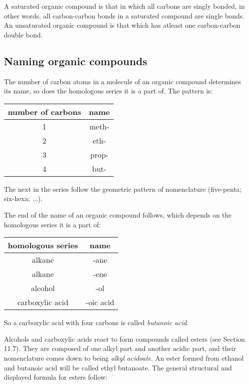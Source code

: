 A saturated organic compound is that in which all carbons are singly bonded, in other words, all
carbon-carbon bonds in a saturated compound are single bonds. An unsaturated organic compound is
that which has atleast one carbon-carbon double bond.

\subsection{Naming organic compounds}

The number of carbon atoms in a molecule of an organic compound determines its name, so does the
homologous series it is a part of. The pattern is:
\begin{center}
	\begin{tabular}{c c}
		number of carbons & name \\\hline
		1 & meth- \\
		2 & eth- \\
		3 & prop- \\
		4 & but- \\
	\end{tabular}
\end{center}
The next in the series follow the geometric pattern of nomenclature (five-penta; six-hexa; ...).

The end of the name of an organic compound follows, which depends on the homologous series it is a
part of:
\begin{center}
	\begin{tabular}{c c}
		homologous series & name \\\hline
		alkane & -ane \\
		alkane & -ene \\
		alcohol & -ol \\
		carboxylic acid & -oic acid \\
	\end{tabular}
\end{center}

So a carboxylic acid with four carbons is called \textit{butanoic acid}.

Alcohols and carboxylic acids react to form compounds called esters (see Section 11.7). They are
composed of one alkyl part and another acidic part, and their nomenclature comes down to being
\textit{alkyl acidoate}. An ester formed from ethanol and butanoic acid will be called ethyl 
butanoate. The general structural and displayed formula for esters follow:

\begin{center}
\end{center}

